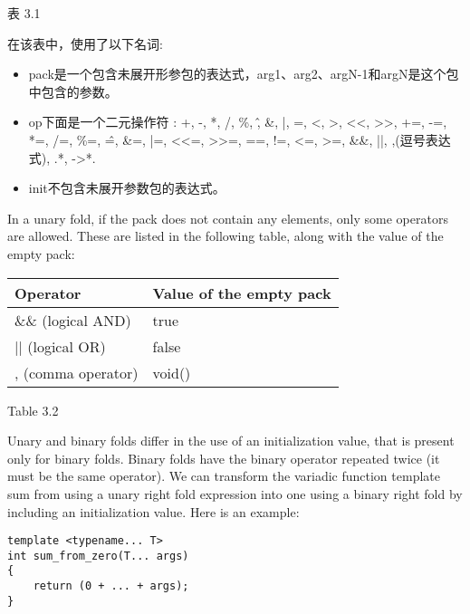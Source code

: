 \begin{center}
表 3.1
\end{center}

在该表中，使用了以下名词:

\begin{itemize}
\item
pack是一个包含未展开形参包的表达式，arg1、arg2、argN-1和argN是这个包中包含的参数。

\item
op下面是一个二元操作符 : +, -, *, /, \%, \^, \&, |, =, <, >, <{}<, >{}>, +=, -=, *=, /=, \%=, \^=, \&=, |=, <{}<=, >{}>=, ==, !=, <=, >=, \&\&, ||, ,(逗号表达式), .*, ->*.

\item
init不包含未展开参数包的表达式。
\end{itemize}

In a unary fold, if the pack does not contain any elements, only some operators are allowed. These are listed in the following table, along with the value of the empty pack:

\begin{table}[H]
\centering
	\begin{tabular}{|l|l|}
		\hline
		\textbf{Operator}  & \textbf{Value of the empty pack} \\ \hline
		\&\& (logical AND) & true                             \\ \hline
		|| (logical OR)    & false                            \\ \hline
		, (comma operator) & void()                           \\ \hline
	\end{tabular}
\end{table}

\begin{center}
Table 3.2
\end{center}

Unary and binary folds differ in the use of an initialization value, that is present only for binary folds. Binary folds have the binary operator repeated twice (it must be the same operator). We can transform the variadic function template sum from using a unary right fold expression into one using a binary right fold by including an initialization value. Here is an example:

\begin{lstlisting}[style=styleCXX]
template <typename... T>
int sum_from_zero(T... args)
{
	return (0 + ... + args);
}
\end{lstlisting}

